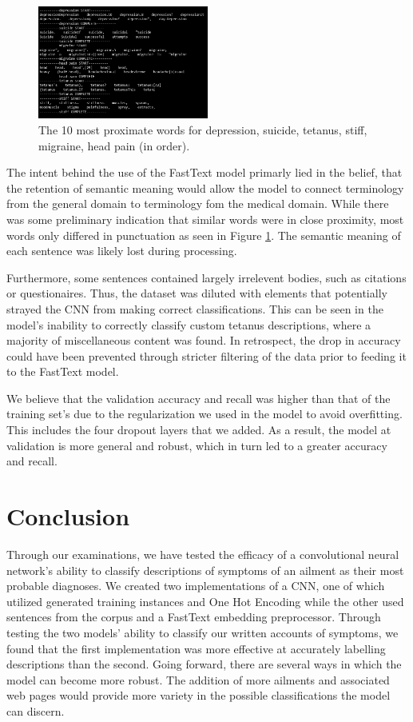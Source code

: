 \documentclass[12pt]{report}
\begin{document}
\begin{figure}[H]
	\centering
	\includegraphics[width=0.5\textwidth]{proximate-words.png}
	\caption{The 10 most proximate words for depression, suicide, tetanus, stiff, migraine, head pain (in order).}
	\label{fig:prox-words}
\end{figure}

The intent behind the use of the FastText model primarly lied in
the belief, that the retention of semantic meaning would allow the
model to connect terminology from the general domain to
terminology fom the medical domain\cite{rehurek2011gensim}. While there was some preliminary
indication that similar words were in close proximity, most words
only differed in punctuation as seen in Figure \ref{fig:prox-words}.
The semantic meaning of each sentence was likely lost during processing.

Furthermore, some sentences contained largely irrelevent bodies, such as
citations or questionaires. Thus, the dataset was diluted with elements that
potentially strayed the CNN from making correct classifications. This can be
seen in the model's inability to correctly classify custom tetanus descriptions,
where a majority of miscellaneous content was found. In retrospect, the drop
in accuracy could have been prevented through stricter filtering of the data
prior to feeding it to the FastText model.

We believe that the validation accuracy and recall was higher than that of the training set's
due to the regularization we used in the model to avoid overfitting.
This includes the four dropout layers that we added. As a result, the model
at validation is more general and robust, which in turn led to a greater
accuracy and recall.

\chapter{Conclusion}

Through our examinations, we have tested the efficacy of a convolutional neural
network's ability to classify descriptions of symptoms of an ailment as their
most probable diagnoses. We created two implementations of a CNN,
one of which utilized generated training instances and One Hot Encoding while
the other used sentences from the corpus and a FastText embedding preprocessor\cite{rehurek2011gensim}. 
Through testing
the two models' ability to classify our written accounts of symptoms, we found
that the first implementation was more effective at accurately labelling
descriptions than the second. Going forward, there are several ways in which the
model can become more robust. The addition of more ailments and associated web
pages would provide more variety in the possible classifications the model can
discern.


\end{document}
